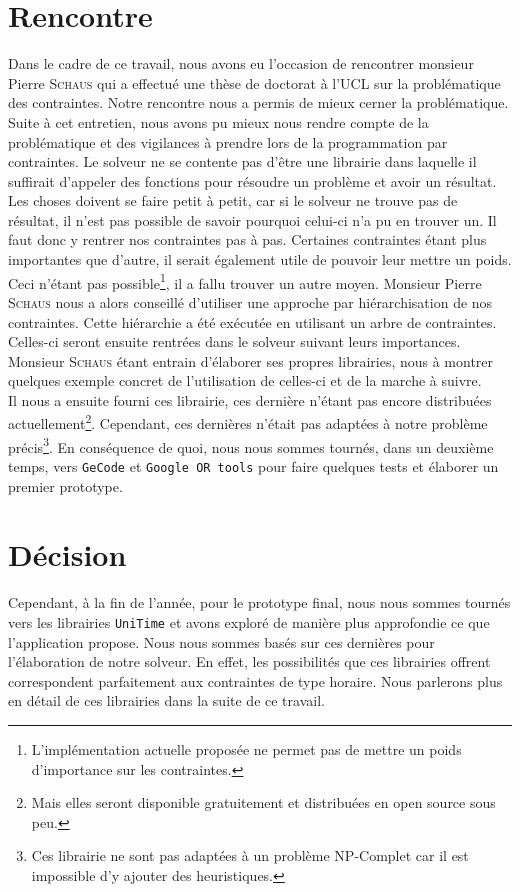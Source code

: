 \section{Rencontre}
Dans le cadre de ce travail, nous avons eu l'occasion de rencontrer monsieur Pierre \textsc{Schaus} qui a effectué une thèse de doctorat à l'UCL sur la problématique des contraintes. Notre rencontre nous a permis de mieux cerner la problématique.
\newline
\indent
Suite à cet entretien, nous avons pu mieux nous rendre compte de la problématique et des vigilances à prendre lors de la programmation par contraintes. Le solveur ne se contente pas d'être une librairie dans laquelle il suffirait d'appeler des fonctions pour résoudre un problème et avoir un résultat. Les choses doivent se faire petit à petit, car si le solveur ne trouve pas de résultat, il n'est pas possible de savoir pourquoi celui-ci n'a pu en trouver un. 
\newline
\indent
Il faut donc y rentrer nos contraintes pas à pas. Certaines contraintes étant plus importantes que d'autre, il serait également utile de pouvoir leur mettre un poids. Ceci n'étant pas possible\footnote{L'implémentation actuelle proposée ne permet pas de mettre un poids d'importance sur les contraintes.}, il a fallu trouver un autre moyen. Monsieur Pierre \textsc{Schaus} nous a alors conseillé d'utiliser une approche par hiérarchisation de nos contraintes. Cette hiérarchie a été exécutée en utilisant un arbre de contraintes. Celles-ci seront ensuite rentrées dans le solveur suivant leurs importances. Monsieur \textsc{Schaus} étant entrain d'élaborer ses propres librairies, nous à montrer quelques exemple concret de l'utilisation de celles-ci et de la marche à suivre.\\
\newline
\indent
Il nous a ensuite fourni ces librairie, ces dernière n'étant pas encore distribuées actuellement\footnote{Mais elles seront disponible gratuitement et distribuées en open source sous peu.}. Cependant, ces dernières n'était pas adaptées à notre problème précis\footnote{Ces librairie ne sont pas adaptées à un problème NP-Complet car il est impossible d'y ajouter des heuristiques.}. En conséquence de quoi, nous nous sommes tournés, dans un deuxième temps, vers  \texttt{GeCode} et \texttt{Google OR tools} pour faire quelques tests et élaborer un premier prototype.

\section{Décision}

Cependant, à la fin de l'année, pour le prototype final, nous nous sommes tournés vers les librairies \texttt{UniTime} et avons exploré de manière plus approfondie ce que l'application propose. Nous nous sommes basés sur ces dernières pour l'élaboration de notre solveur. En effet, les possibilités que ces librairies offrent correspondent parfaitement aux contraintes de type horaire. Nous parlerons plus en détail de ces librairies dans la suite de ce travail.



